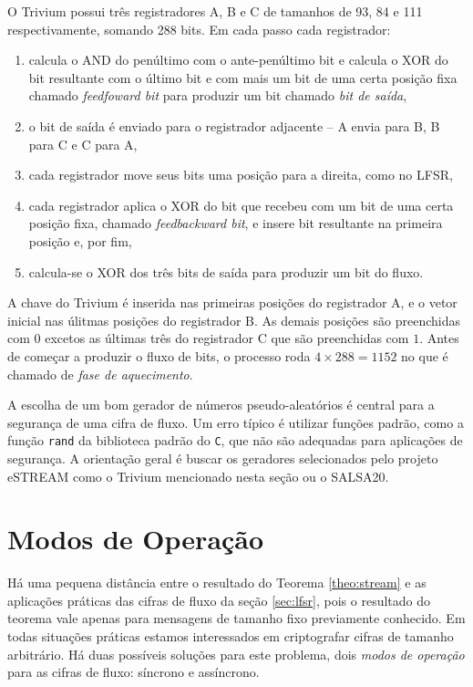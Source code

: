 O Trivium possui três registradores A, B e C de tamanhos de 93, 84 e 111 respectivamente, somando 288 bits.
Em cada passo cada registrador:
\begin{enumerate}
\item calcula o AND do penúltimo com o ante-penúltimo bit e calcula o XOR do bit resultante com o último bit e com mais um bit de uma certa posição fixa chamado {\em feedfoward bit} para produzir um bit chamado {\em bit de saída},
\item o bit de saída é enviado para o registrador adjacente -- A envia para B, B para C e C para A,
\item cada registrador move seus bits uma posição para a direita, como no LFSR,
\item cada registrador aplica o XOR do bit que recebeu com um bit de uma certa posição fixa, chamado {\em feedbackward bit}, e insere bit resultante na primeira posição e, por fim,
\item calcula-se o XOR dos três bits de saída para produzir um bit do fluxo.
\end{enumerate}

A chave do Trivium é inserida nas primeiras posições do registrador A, e o vetor inicial nas úlitmas posições do registrador B.
As demais posições são preenchidas com $0$ excetos as últimas três do registrador C que são preenchidas com $1$.
Antes de começar a produzir o fluxo de bits, o processo roda $4 \times 288 = 1152$ no que é chamado de {\em fase de aquecimento}. 


A escolha de um bom gerador de números pseudo-aleatórios é central para a segurança de uma cifra de fluxo.
Um erro típico é utilizar funções padrão, como a função {\tt rand} da biblioteca padrão do {\tt C}, que não são adequadas para aplicações de segurança.
A orientação geral é buscar os geradores selecionados pelo projeto eSTREAM como o Trivium mencionado nesta seção ou o SALSA20.

\section{Modos de Operação}
\label{sec:modos-de-operacao}

Há uma pequena distância entre o resultado do Teorema \ref{theo:stream} e as aplicações práticas das cifras de fluxo da seção \ref{sec:lfsr}, pois o resultado do teorema vale apenas para mensagens de tamanho fixo previamente conhecido.
Em todas situações práticas estamos interessados em criptografar cifras de tamanho arbitrário.
Há duas possíveis soluções para este problema, dois {\em modos de operação} para as cifras de fluxo: síncrono e assíncrono.

